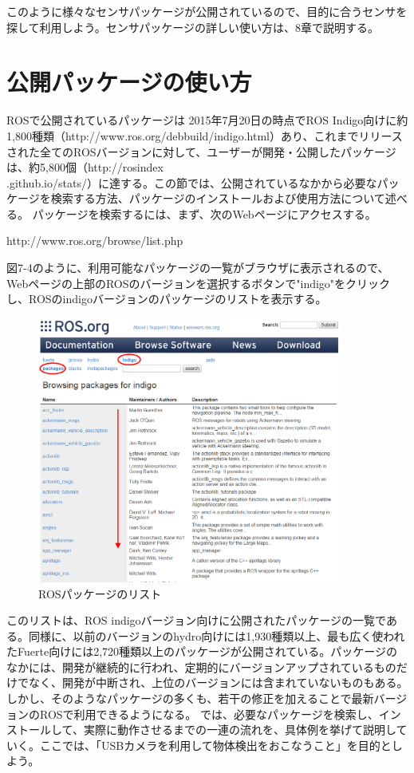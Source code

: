 このように様々なセンサパッケージが公開されているので、目的に合うセンサを探して利用しよう。センサパッケージの詳しい使い方は、8章で説明する。

\section{公開パッケージの使い方}

ROSで公開されているパッケージは 2015年7月20日の時点でROS Indigo向けに約1,800種類（http://www.ros.org/debbuild/indigo.html）あり、これまでリリースされた全てのROSバージョンに対して、ユーザーが開発・公開したパッケージは、約5,800個（http://rosindex\\.github.io/stats/）に達する。この節では、公開されているなかから必要なパッケージを検索する方法、パッケージのインストールおよび使用方法について述べる。
パッケージを検索するには、まず、次のWebページにアクセスする。

http://www.ros.org/browse/list.php

図7-4のように、利用可能なパッケージの一覧がブラウザに表示されるので、Webページの上部のROSのバージョンを選択するボタンで"indigo"をクリックし、ROSのindigoバージョンのパッケージのリストを表示する。

\begin{figure}[htp]
  \centering
  \includegraphics[width=10cm]{pictures/chapter7/pic_07_04.png}
  \caption{ROSパッケージのリスト}
\end{figure}


このリストは、ROS indigoバージョン向けに公開されたパッケージの一覧である。同様に、以前のバージョンのhydro向けには1,930種類以上、最も広く使われたFuerte向けには2,720種類以上のパッケージが公開されている。パッケージのなかには、開発が継続的に行われ、定期的にバージョンアップされているものだけでなく、開発が中断され、上位のバージョンには含まれていないものもある。しかし、そのようなパッケージの多くも、若干の修正を加えることで最新バージョンのROSで利用できるようになる。
では、必要なパッケージを検索し、インストールして、実際に動作させるまでの一連の流れを、具体例を挙げて説明していく。ここでは、「USBカメラを利用して物体検出をおこなうこと」を目的としよう。

